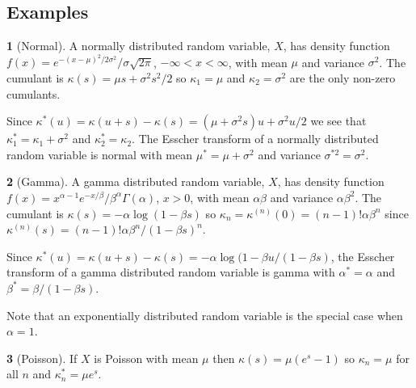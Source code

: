 \documentclass[fleqn]{amsart}
\theoremstyle{definition}
\newtheorem*{example}{}
\begin{document}
\subsection{Examples}
\begin{example}[Normal]
A normally distributed random variable, \(X\), has density function 
\(f(x) = e^{-(x - \mu)^2/2\sigma^2}/\sigma\sqrt{2\pi}\), \(-\infty<x<\infty\),
with mean \(\mu\) and variance \(\sigma^2\).
The cumulant is \(\kappa(s) = \mu s + \sigma^2s^2/2\) so
\(\kappa_1 = \mu\) and \(\kappa_2 = \sigma^2\) are the only non-zero
cumulants. 
\end{example}

Since \(\kappa^*(u) = \kappa(u + s) - \kappa(s) = (\mu + \sigma^2s)u + \sigma^2u/2\)
we see that \(\kappa^*_1 = \kappa_1 + \sigma^2\) and \(\kappa^*_2 = \kappa_2\). The
Esscher transform of a normally distributed random variable is normal
with mean \(\mu^* = \mu + \sigma^2\) and variance \(\sigma^{*2} = \sigma^2\).


\begin{example}[Gamma]
A gamma distributed random variable, \(X\), has density function
\(f(x) = x^{\alpha - 1} e^{-x/\beta}/\beta^\alpha\Gamma(\alpha)\), \(x > 0\),
with mean \(\alpha\beta\) and variance \(\alpha\beta^2\).
The cumulant is \(\kappa(s) = -\alpha\log(1 - \beta s)\) so
\(\kappa_n = \kappa^{(n)}(0) = (n-1)!\alpha\beta^n\) since
\(\kappa^{(n)}(s) = (n-1)!\alpha\beta^n/(1 - \beta s)^n\).

Since \(\kappa^*(u) = \kappa(u + s) - \kappa(s) = -\alpha\log (1 - \beta u/(1 - \beta s)\),
the Esscher transform of a gamma distributed random variable is gamma
with \(\alpha^* = \alpha\) and \(\beta^* = \beta/(1 - \beta s)\).

Note that an exponentially distributed random variable is the special case when 
\(\alpha = 1\).
\end{example}

\begin{example}[Poisson]
If \(X\) is Poisson
with mean \(\mu\) then \(\kappa(s) = \mu(e^s - 1)\) so
\(\kappa_n = \mu\) for all \(n\) and
\(\kappa_n^* = \mu e^s\).
\end{example}
\end{document}
